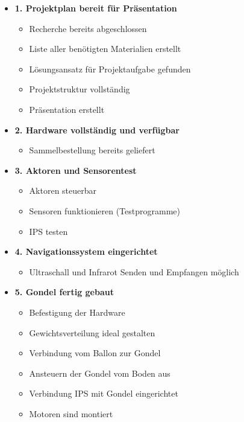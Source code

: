 \documentclass[lang=ngerman,inputenc=utf8,fontsize=10pt]{ldvarticle}
\begin{document}
\begin{itemize}
\item \textbf{1. Projektplan bereit für Präsentation}
\begin{itemize}
\item Recherche bereits abgeschlossen
\item Liste aller benötigten Materialien erstellt
\item Lösungsansatz für Projektaufgabe gefunden
\item Projektstruktur vollständig
\item Präsentation erstellt
\end{itemize}
\item \textbf{2. Hardware vollständig und verfügbar}
\begin{itemize}
\item Sammelbestellung bereits geliefert
\end{itemize}
\item \textbf{3. Aktoren und Sensorentest}
\begin{itemize}
\item Aktoren steuerbar
\item Sensoren funktionieren (Testprogramme)
\item IPS testen
\end{itemize}
\item \textbf{4. Navigationssystem eingerichtet}
\begin{itemize}
\item Ultraschall und Infrarot Senden und Empfangen möglich
\end{itemize}
\item \textbf{5. Gondel fertig gebaut}
\begin{itemize}
\item Befestigung der Hardware
\item Gewichtsverteilung ideal gestalten
\item Verbindung vom Ballon zur Gondel
\item Ansteuern der Gondel vom Boden aus
\item Verbindung IPS mit Gondel eingerichtet
\item Motoren sind montiert
\end{itemize}


\end{itemize}
\end{document}
